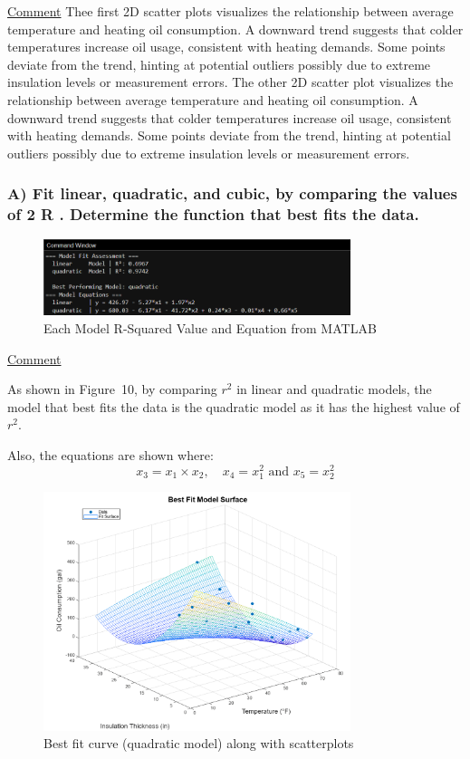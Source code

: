 \documentclass[12pt]{article}
\begin{document}
\uline{Comment}
Thee first 2D scatter plots visualizes the relationship between average temperature and
heating oil consumption. A downward trend suggests that colder temperatures increase oil
usage, consistent with heating demands. Some points deviate from the trend, hinting at
potential outliers possibly due to extreme insulation levels or measurement errors.
The other 2D scatter plot visualizes the relationship between average temperature and
heating oil consumption. A downward trend suggests that colder temperatures increase oil
usage, consistent with heating demands. Some points deviate from the trend, hinting at
potential outliers possibly due to extreme insulation levels or measurement errors.


\subsubsection*{A) Fit linear, quadratic, and cubic, by comparing the values of 2 R . Determine the
function that best fits the data.}

\begin{figure}[H]
    \centering
    \includegraphics[width=0.8\textwidth]{10.png}
    \caption{Each Model R-Squared Value and Equation from MATLAB}
\end{figure}

\uline{Comment}

As shown in Figure~10, by comparing \( r^2 \) in linear and quadratic models, the model that best fits the data is the quadratic model as it has the highest value of \( r^2 \).

Also, the equations are shown where:
\[
x_3 = x_1 \times x_2, \quad x_4 = x_1^2 \text{ and } x_5 = x_2^2
\]

\begin{figure}[H]
    \centering
    \includegraphics[width=0.8\textwidth]{11.png}
    \caption{Best fit curve (quadratic model) along with scatterplots}
\end{figure}
\end{document}

